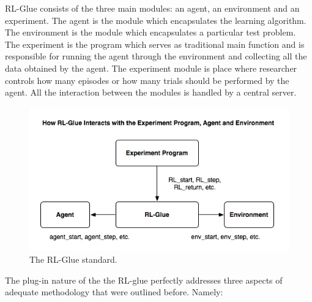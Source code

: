 RL-Glue consists of the three main modules: an agent, an environment and an experiment. The agent is the module which encapsulates the learning algorithm. The environment is the module which encapsulates a particular test problem. The experiment is the program which serves as traditional main function and is responsible for running the agent through the environment and collecting all the data obtained by the agent. The experiment module is place where researcher controls how many episodes or how many trials should be performed by the agent. All the interaction between the modules is handled by a central server. \\
\begin{figure}[ht]
\vskip 0.2in
\centering
\includegraphics[scale=0.9]{glue.png}
\caption{The RL-Glue standard.}
\vskip -0.2in
\label{rlglue}
\end{figure}
The plug-in nature of the the RL-glue perfectly addresses three aspects of adequate methodology that were outlined before. Namely:

